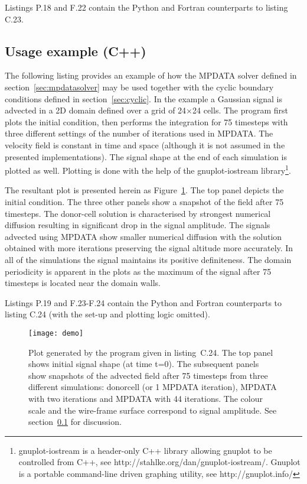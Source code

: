\documentclass[final,5p,times,twocolumn]{elsarticle}
\newcounter{lstnocpp}
\newcounter{linenocpp}
\newcommand*\FancyVerbStartString{}
\newcommand*\FancyVerbStopString{}
\newcommand{\codecpp}[4]{%
  \addtocounter{lstnocpp}{1}%
  \renewcommand*\FancyVerbStartString{\PY{c+c1}{//#2}}%
  \renewcommand*\FancyVerbStopString{\PY{c+c1}{//#3}}%
  \setcounter{FancyVerbLine}{\thelinenocpp}%
  \fvset{label={listing~C.\thelstnocpp~(C++)},rulecolor=\color{black},stepnumber=#4}%
  \setcounter{linenocpp}{\value{FancyVerbLine}}%
}
\newcommand{\url}[1]{{#1}}
\begin{document}
  Listings P.18 and F.22 contain the Python and Fortran counterparts to listing C.23.
 
  \subsection{Usage example (C++)}\label{sec:example}

  The following listing provides an example of how the MPDATA solver
    defined in section~\ref{sec:mpdatasolver} may be used together
    with the cyclic boundary conditions defined in section~\ref{sec:cyclic}.
  In the example a Gaussian signal is advected in a 2D domain 
    defined over a grid of 24$\times$24 cells.
  The program first plots the initial condition, then performs
    the integration for 75 timesteps with three different 
    settings of the number of iterations used in MPDATA.
  The velocity field is constant in time and space (although it is
    not assumed in the presented implementations).
  The signal shape at the end of each simulation is plotted as well.
  Plotting is done with the help of the gnuplot-iostream library\footnote{gnuplot-iostream
    is a header-only C++ library allowing gnuplot to be controlled from C++, see \url{http://stahlke.org/dan/gnuplot-iostream/}. 
    Gnuplot is a portable command-line driven graphing utility, see \url{http://gnuplot.info/}}.

  The resultant plot is presented herein as Figure~\ref{fig:mpdata}.
  The top panel depicts the initial condition. 
  The three other panels show a snapshot of the field after 75 timesteps.
  The donor-cell solution is characterised by strongest numerical diffusion
    resulting in significant drop in the signal amplitude.
  The signals advected using MPDATA show smaller numerical diffusion with
    the solution obtained with more iterations preserving the signal altitude 
    more accurately.
  In all of the simulations the signal maintains its positive definiteness.
  The domain periodicity is apparent in the plots as the maximum of the signal 
    after 75 timesteps is located near the domain walls.

  Listings P.19 and F.23-F.24 contain the Python and Fortran 
    counterparts to listing C.24 (with the set-up and plotting logic omitted).

  \codecpp{code-cpp-plot.cpp}{listing20}{listing21}{1}

  \begin{figure}
    \texttt{[image: demo]}
    \caption{\label{fig:mpdata}
      Plot generated by the program given in listing~C.24.
      The top panel shows initial signal shape (at time t=0).
      The subsequent panels show snapshots of the advected field after 75 timesteps
        from three different simulations: donorcell (or 1 MPDATA iteration), MPDATA
        with two iterations and MPDATA with 44 iterations.
      The colour scale and the wire-frame surface correspond to signal amplitude.
      See section~\ref{sec:example} for discussion.
    }
  \end{figure}
\end{document}
